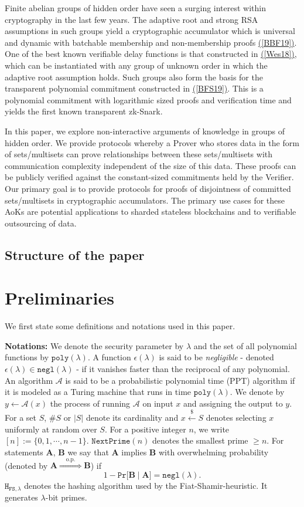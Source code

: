 \documentclass[11pt, lettersize, notitlepage, leqno, footskip=0.6cm]{article}
\newcommand{\ttt}{\texttt}
\newcommand{\negl}{\ttt{{negl}}}
\newcommand{\impop}{\overset{\;\;\;\;\mr{o.p.}\;\;\;\;}{\Longrightarrow}}
\newcommand{\mc}{\mathcal}
\newcommand{\mbf}{\mathbf}
\newcommand{\mr}{\mathrm}
\newcommand{\lam}{\lambda}
\newcommand{\vs}{\vspace{-0.15cm}}
\newcommand{\noin}{\noindent}
\newcommand{\op}{overwhelming probability}
\numberwithin{equation}{section}
\begin{document}
Finite abelian groups of hidden order have seen a surging interest within cryptography in the last few years. The adaptive root and strong RSA assumptions in such groups yield a cryptographic accumulator which is universal and dynamic with batchable membership and non-membership proofs \hyperlink{BBF19}{([BBF19])}. One of the best known verifiable delay functions is that constructed in \hyperlink{Wes18}{([Wes18])}, which can be instantiated with any group of unknown order in which the adaptive root assumption holds. Such groups also form the basis for the transparent polynomial commitment constructed in \hyperlink{BFS19}{([BFS19])}. This is a polynomial commitment with logarithmic sized proofs and verification time and yields the first known transparent zk-Snark.

In this paper, we explore non-interactive arguments of knowledge in groups of hidden order. We provide protocols whereby a Prover who stores data in the form of sets/multisets can prove relationships between these sets/multisets with communication complexity independent of the size of this data. These proofs can be publicly verified against the constant-sized commitments held by the Verifier. Our primary goal is to provide protocols for proofs of disjointness of committed sets/multisets in cryptographic accumulators. The primary use cases for these AoKs are potential applications to sharded stateless blockchains and to verifiable outsourcing of data.


\subsection{\fontsize{11}{11}\selectfont Structure of the paper }

\section{\fontsize{12}{12}\selectfont Preliminaries}

\noin We first state some definitions and notations used in this paper. \vspace{0.15cm}

\noin \textbf{Notations:} We denote the security parameter by $\lam$ and the set of all polynomial functions by $\ttt{poly}(\lam)$. A function $\epsilon(\lam)$ is said to be \textit{negligible} - denoted $\epsilon(\lam)\in \ttt{negl}(\lam)$ - if it vanishes faster than the reciprocal of any polynomial. An algorithm $\mc{A}$ is said to be a probabilistic polynomial time  (PPT) algorithm if it is modeled as a Turing machine that runs in time $\ttt{poly}(\lam)$. We denote by $y\gets \mc{A}(x)$ the process of running $\mc{A}$ on input $x$ and assigning the output to $y$. For a set $S$, $\# S$ or $|S|$ denote its cardinality and $x\xleftarrow{\$} S$ denotes selecting $x$ uniformly at random over $S$. For a positive integer $n$, we write $[n]:=\{0,1,\cdots,n-1\}$.  $\ttt{NextPrime}(n)$ denotes the smallest prime $\geq n$. For statements $\mbf{A}$, $\mbf{B}$ we say that $\mbf{A}$ implies $\mbf{B}$ with \op\;  (denoted by $\mbf{A}\impop \mbf{B}$) if \vs $$1 - \ttt{Pr}\big[\mbf{B}\;\big|\;\mbf{A}\big] = \negl(\lam).$$ $\ttt{H}_{\ttt{FS},\lam}$ denotes the hashing algorithm used by the Fiat-Shamir-heuristic. It generates $\lam$-bit primes.
\end{document}
